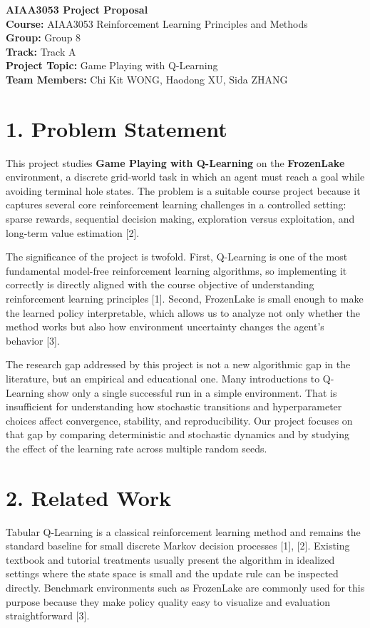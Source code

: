 \documentclass[11pt]{article}
\begin{document}
\begin{center}
{\Large \textbf{AIAA3053 Project Proposal}}\\[0.6em]
\textbf{Course:} AIAA3053 Reinforcement Learning Principles and Methods\\
\textbf{Group:} Group 8\\
\textbf{Track:} Track A\\
\textbf{Project Topic:} Game Playing with Q-Learning\\
\textbf{Team Members:} Chi Kit WONG, Haodong XU, Sida ZHANG
\end{center}

\section*{1. Problem Statement}
This project studies \textbf{Game Playing with Q-Learning} on the \textbf{FrozenLake} environment, a discrete grid-world task in which an agent must reach a goal while avoiding terminal hole states. The problem is a suitable course project because it captures several core reinforcement learning challenges in a controlled setting: sparse rewards, sequential decision making, exploration versus exploitation, and long-term value estimation [2].

The significance of the project is twofold. First, Q-Learning is one of the most fundamental model-free reinforcement learning algorithms, so implementing it correctly is directly aligned with the course objective of understanding reinforcement learning principles [1]. Second, FrozenLake is small enough to make the learned policy interpretable, which allows us to analyze not only whether the method works but also how environment uncertainty changes the agent's behavior [3].

The research gap addressed by this project is not a new algorithmic gap in the literature, but an empirical and educational one. Many introductions to Q-Learning show only a single successful run in a simple environment. That is insufficient for understanding how stochastic transitions and hyperparameter choices affect convergence, stability, and reproducibility. Our project focuses on that gap by comparing deterministic and stochastic dynamics and by studying the effect of the learning rate across multiple random seeds.

\section*{2. Related Work}
Tabular Q-Learning is a classical reinforcement learning method and remains the standard baseline for small discrete Markov decision processes [1], [2]. Existing textbook and tutorial treatments usually present the algorithm in idealized settings where the state space is small and the update rule can be inspected directly. Benchmark environments such as FrozenLake are commonly used for this purpose because they make policy quality easy to visualize and evaluation straightforward [3].
\end{document}
